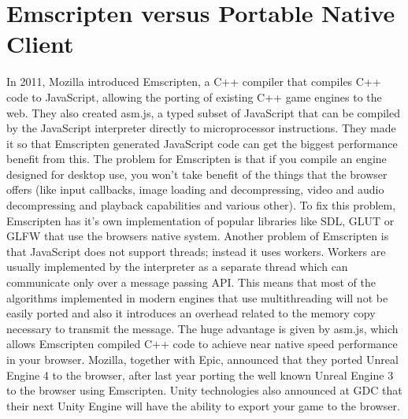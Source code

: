 \section{Emscripten versus Portable Native Client}
\label{sec: Emscripten, PNaCl}

In 2011, Mozilla introduced Emscripten, a C++ compiler that compiles C++ code to JavaScript, allowing the porting of existing C++ game engines to the web. They also created asm.js, a typed subset of JavaScript that can be compiled by the JavaScript interpreter directly to microprocessor instructions. They made it so that Emscripten generated JavaScript code can get the biggest performance benefit from this. The problem for Emscripten is that if you compile an engine designed for desktop use, you won't take benefit of the things that the browser offers (like input callbacks, image loading and decompressing, video and audio decompressing and playback capabilities and various other). To fix this problem, Emscripten has it's own implementation of popular libraries like SDL, GLUT or GLFW that use the browsers native system. Another problem of Emscripten is that JavaScript does not support threads; instead it uses workers. Workers are usually implemented by the interpreter as a separate thread which can communicate only over a message passing API. This means that most of the algorithms implemented in modern engines that use multithreading will not be easily ported and also it introduces an overhead related to the memory copy necessary to transmit the message. The huge advantage is given by asm.js, which allows Emscripten compiled C++ code to achieve near native speed performance in your browser. Mozilla, together with Epic, announced that they ported Unreal Engine 4 to the browser, after last year porting the well known Unreal Engine 3 to the browser using Emscripten. Unity technologies also announced at GDC that their next Unity Engine will have the ability to export your game to the browser.


